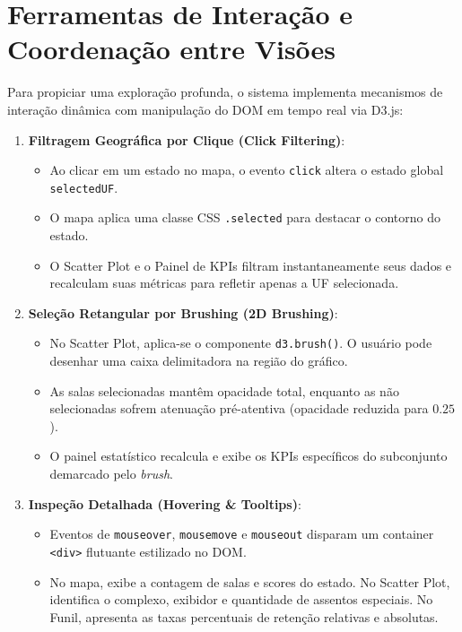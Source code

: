 \documentclass[12pt]{article}
\begin{document}
\section{Ferramentas de Interação e Coordenação entre Visões}

Para propiciar uma exploração profunda, o sistema implementa mecanismos de interação dinâmica com 
manipulação do DOM em tempo real via D3.js:

\begin{enumerate}
    \item \textbf{Filtragem Geográfica por Clique (Click Filtering)}:
    \begin{itemize}
    \item Ao clicar em um estado no mapa, o evento \texttt{click} altera o estado global \texttt{selectedUF}.
    \item O mapa aplica uma classe CSS \texttt{.selected} para destacar o contorno do estado.
    \item O Scatter Plot e o Painel de KPIs filtram instantaneamente seus dados e recalculam suas métricas para refletir apenas a UF selecionada.
    \end{itemize}
    
    \item \textbf{Seleção Retangular por Brushing (2D Brushing)}:
    \begin{itemize}
    \item No Scatter Plot, aplica-se o componente \texttt{d3.brush()}. O usuário pode desenhar uma caixa delimitadora na região do gráfico.
    \item As salas selecionadas mantêm opacidade total, enquanto as não selecionadas sofrem atenuação pré-atentiva (opacidade reduzida para $0.25$).
    \item O painel estatístico recalcula e exibe os KPIs específicos do subconjunto demarcado pelo \textit{brush}.
    \end{itemize}
    
    \item \textbf{Inspeção Detalhada (Hovering \& Tooltips)}:
    \begin{itemize}
    \item Eventos de \texttt{mouseover}, \texttt{mousemove} e \texttt{mouseout} disparam um container \texttt{<div>} flutuante estilizado no DOM.
    \item No mapa, exibe a contagem de salas e scores do estado. No Scatter Plot, identifica o complexo, exibidor e quantidade de assentos especiais. No Funil, apresenta as taxas percentuais de retenção relativas e absolutas.
    \end{itemize}
\end{enumerate}
\end{document}
